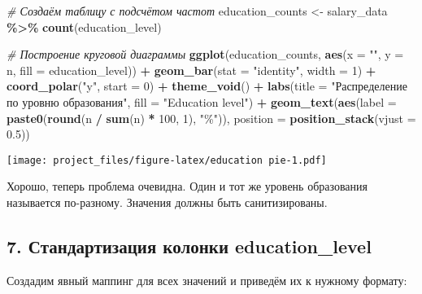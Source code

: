 \documentclass[
]{article}
\newenvironment{Shaded}{\begin{snugshade}}{\end{snugshade}}
\newcommand{\AttributeTok}[1]{\textcolor[rgb]{0.13,0.29,0.53}{#1}}
\newcommand{\CommentTok}[1]{\textcolor[rgb]{0.56,0.35,0.01}{\textit{#1}}}
\newcommand{\DecValTok}[1]{\textcolor[rgb]{0.00,0.00,0.81}{#1}}
\newcommand{\FloatTok}[1]{\textcolor[rgb]{0.00,0.00,0.81}{#1}}
\newcommand{\FunctionTok}[1]{\textcolor[rgb]{0.13,0.29,0.53}{\textbf{#1}}}
\newcommand{\NormalTok}[1]{#1}
\newcommand{\OtherTok}[1]{\textcolor[rgb]{0.56,0.35,0.01}{#1}}
\newcommand{\SpecialCharTok}[1]{\textcolor[rgb]{0.81,0.36,0.00}{\textbf{#1}}}
\newcommand{\StringTok}[1]{\textcolor[rgb]{0.31,0.60,0.02}{#1}}
\begin{document}
\begin{Shaded}
\begin{Highlighting}[]
\CommentTok{\# Создаём таблицу с подсчётом частот}
\NormalTok{education\_counts }\OtherTok{\textless{}{-}}\NormalTok{ salary\_data }\SpecialCharTok{\%\textgreater{}\%}
  \FunctionTok{count}\NormalTok{(education\_level)}

\CommentTok{\# Построение круговой диаграммы}
\FunctionTok{ggplot}\NormalTok{(education\_counts, }\FunctionTok{aes}\NormalTok{(}\AttributeTok{x =} \StringTok{""}\NormalTok{, }\AttributeTok{y =}\NormalTok{ n, }\AttributeTok{fill =}\NormalTok{ education\_level)) }\SpecialCharTok{+}
  \FunctionTok{geom\_bar}\NormalTok{(}\AttributeTok{stat =} \StringTok{"identity"}\NormalTok{, }\AttributeTok{width =} \DecValTok{1}\NormalTok{) }\SpecialCharTok{+}
  \FunctionTok{coord\_polar}\NormalTok{(}\StringTok{"y"}\NormalTok{, }\AttributeTok{start =} \DecValTok{0}\NormalTok{) }\SpecialCharTok{+}
  \FunctionTok{theme\_void}\NormalTok{() }\SpecialCharTok{+}
  \FunctionTok{labs}\NormalTok{(}\AttributeTok{title =} \StringTok{"Распределение по уровню образования"}\NormalTok{, }\AttributeTok{fill =} \StringTok{"Education level"}\NormalTok{) }\SpecialCharTok{+}
  \FunctionTok{geom\_text}\NormalTok{(}\FunctionTok{aes}\NormalTok{(}\AttributeTok{label =} \FunctionTok{paste0}\NormalTok{(}\FunctionTok{round}\NormalTok{(n }\SpecialCharTok{/} \FunctionTok{sum}\NormalTok{(n) }\SpecialCharTok{*} \DecValTok{100}\NormalTok{, }\DecValTok{1}\NormalTok{), }\StringTok{"\%"}\NormalTok{)), }
            \AttributeTok{position =} \FunctionTok{position\_stack}\NormalTok{(}\AttributeTok{vjust =} \FloatTok{0.5}\NormalTok{))}
\end{Highlighting}
\end{Shaded}

\texttt{[image: project\_files/figure-latex/education pie-1.pdf]}

Хорошо, теперь проблема очевидна. Один и тот же уровень образования
называется по-разному. Значения должны быть санитизированы.

\subsection{7. Стандартизация колонки
education\_level}\label{ux441ux442ux430ux43dux434ux430ux440ux442ux438ux437ux430ux446ux438ux44f-ux43aux43eux43bux43eux43dux43aux438-education_level}

Создадим явный маппинг для всех значений и приведём их к нужному
формату:
\end{document}

